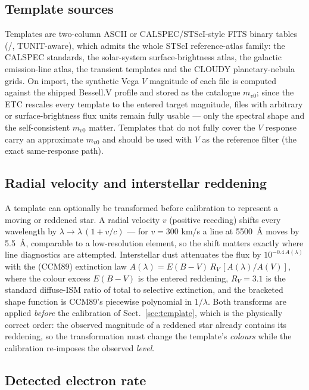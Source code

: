 \subsection{Template sources}

Templates are two-column ASCII or CALSPEC/STScI-style FITS binary tables
(/, TUNIT-aware), which admits the whole STScI
reference-atlas family: the CALSPEC standards, the solar-system
surface-brightness atlas, the galactic emission-line atlas, the transient
templates and the CLOUDY planetary-nebula grids. On import, the synthetic
Vega $V$ magnitude of each file is computed against the shipped Bessell.V
profile and stored as the catalogue $m_{v0}$; since the ETC rescales every
template to the entered target magnitude, files with arbitrary or
surface-brightness flux units remain fully usable — only the spectral shape
and the self-consistent $m_{v0}$ matter. Templates that do not fully cover
the $V$ response carry an approximate $m_{v0}$ and should be used with $V$
as the reference filter (the exact same-response path).

\subsection{Radial velocity and interstellar reddening}
\label{sec:transform}

A template can optionally be transformed before calibration to represent a
moving or reddened star. A radial velocity $v$ (positive receding) shifts
every wavelength by $\lambda \rightarrow \lambda\,(1 + v/c)$ — for
$v = 300$ km/s a line at \SI{5500}{\angstrom} moves by \SI{5.5}{\angstrom},
comparable to a low-resolution element, so the shift matters exactly where
line diagnostics are attempted. Interstellar dust attenuates the flux by
$10^{-0.4\,A(\lambda)}$ with the \citet{cardelli1989} (CCM89) extinction
law $A(\lambda) = E(B\!-\!V)\,R_V\,[A(\lambda)/A(V)]$, where the colour
excess $E(B\!-\!V)$ is the entered reddening, $R_V = 3.1$ is the standard
diffuse-ISM ratio of total to selective extinction, and the bracketed
shape function is CCM89's piecewise polynomial in $1/\lambda$. Both
transforms are applied \emph{before} the calibration of
Sect.~\ref{sec:template}, which is the physically correct order: the
observed magnitude of a reddened star already contains its reddening, so
the transformation must change the template's \emph{colours} while the
calibration re-imposes the observed \emph{level}.

\subsection{Detected electron rate}

